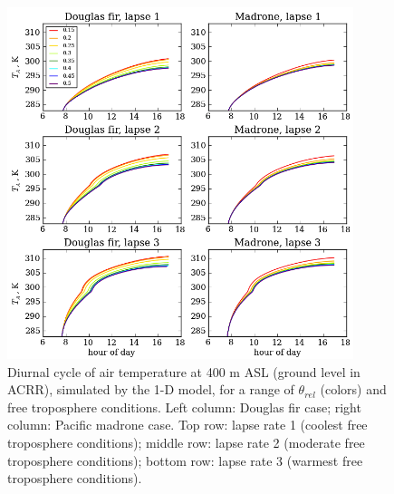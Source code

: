 \begin{figure}[here]
\includegraphics[width=0.9\textwidth]{ch2-BL/figures/testall_compare_sm_lapse_Ta_cropped.png}
\caption{Diurnal cycle of air temperature at 400 m ASL (ground level in ACRR), simulated by the 1-D model, for a range of $\theta_{rel}$ (colors) and free troposphere conditions.  Left column: Douglas fir case; right column: Pacific madrone case.  Top row: lapse rate 1 (coolest free troposphere conditions); middle row: lapse rate 2 (moderate free troposphere conditions); bottom row: lapse rate 3 (warmest free troposphere conditions).}
\label{fig:BL_1DdiurnalTa}
\end{figure}

